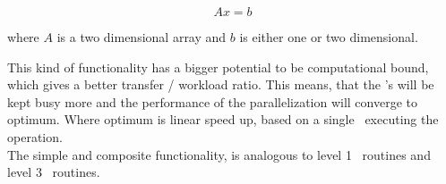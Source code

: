 \[
Ax = b
\]

where $A$ is a two dimensional array and $b$ is either one or two
dimensional.


This kind of functionality has a bigger potential to be computational
bound, which gives a better transfer / workload ratio. This means,
that the \SPU{}'s will be kept busy more and the performance of the
parallelization will converge to optimum. Where optimum is linear
speed up, based on a single \SPE\ executing the operation.\\

The simple and composite functionality, is analogous to level 1 \BLAS\
routines and level 3 \BLAS\ routines.

